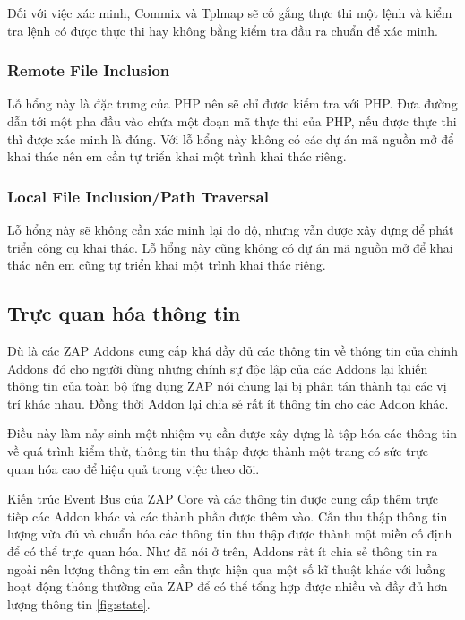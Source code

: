 \documentclass[./../main.tex]{subfiles}
\begin{document}
Đối với việc xác minh, Commix và Tplmap sẽ cố gắng thực thi một lệnh
và kiểm tra lệnh có được thực thi hay không bằng kiểm tra đầu ra chuẩn
để xác minh.

\subsubsection{Remote File Inclusion}
Lỗ hổng này là đặc trưng của PHP nên sẽ chỉ được kiểm tra với PHP. Đưa
đường dẫn tới một pha đầu vào chứa một đoạn mã thực thi của PHP, nếu
được thực thi thì được xác minh là đúng. Với lỗ hổng này không có các
dự án mã nguồn mở để khai thác nên em cần tự triển khai một trình khai
thác riêng.
\subsubsection{Local File Inclusion/Path Traversal}
Lỗ hổng này sẽ không cần xác minh lại do độ, nhưng vẫn được xây dựng để
phát triển công cụ khai thác. Lỗ hổng này cũng không có dự án mã nguồn
mở để khai thác nên em cũng tự triển khai một trình khai thác riêng.

\subsection{Trực quan hóa thông tin}
Dù là các ZAP Addons cung cấp khá đầy đủ các thông tin về thông tin của
chính Addons đó cho người dùng nhưng chính sự độc lập của các Addons lại
khiến thông tin của toàn bộ ứng dụng ZAP nói chung lại bị phân tán thành
tại các vị trí khác nhau. Đồng thời Addon lại chia sẻ rất ít thông
tin cho các Addon khác.

Điều này làm nảy sinh một nhiệm vụ cần được xây dựng là tập hóa các thông
tin về quá trình kiểm thử, thông tin thu thập được thành một trang có sức
trực quan hóa cao để hiệu quả trong việc theo dõi.

Kiến trúc Event Bus của ZAP Core và các thông tin được cung cấp thêm trực
tiếp các Addon khác và các thành phần được thêm vào. Cần thu thập thông
tin lượng vừa đủ và chuẩn hóa các thông tin thu thập được thành một miền
cố định để có thể trực quan hóa. Như đã nói ở trên, Addons rất ít chia sẻ
thông tin ra ngoài nên lượng thông tin em cần thực hiện qua một số kĩ
thuật khác với luồng hoạt động thông thường của ZAP để có thể tổng hợp
được nhiều và đầy đủ hơn lượng thông tin \ref{fig:state}.
\end{document}
